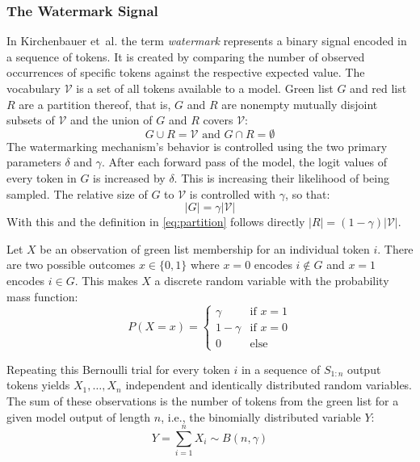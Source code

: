 	\subsubsection{The Watermark Signal}
	\label{sec:watermarkSignal}
    In Kirchenbauer et~al.\cite{kirchenbauer2023watermark} the term \emph{watermark} represents a binary signal encoded in a sequence of tokens. 
	It is created by comparing the number of observed occurrences of specific tokens against the respective expected value. 
	The vocabulary $\mathcal{V}$ is a set of all tokens available to a model. 
	Green list $G$ and red list $R$ are a partition thereof, that is, $G$ and $R$ are nonempty mutually disjoint subsets of $\mathcal{V}$ and the union of $G$ and $R$ covers $\mathcal{V}$:
	\begin{equation} \label{eq:partition}
		G \cup R = \mathcal{V} \text{ and } G \cap R = \emptyset
	\end{equation}
	The watermarking mechanism's behavior is controlled using the two primary parameters $\delta$ and $\gamma$.
	After each forward pass of the model, the logit values of every token in $G$ is increased by $\delta$.
	This is increasing their likelihood of being sampled.
	The relative size of $G$ to $\mathcal{V}$ is controlled with $\gamma$, so that:
	\begin{equation} 
		|G| = \gamma |\mathcal{V}|
	\end{equation}
	With this and the definition in \ref{eq:partition} follows directly $|R| = (1-\gamma) |\mathcal{V}|$.
	
	Let $X$ be an observation of green list membership for an individual token $i$. 
	There are two possible outcomes $x \in \{0,1\}$ where $x=0$ encodes $i \notin G$ and $x=1$ encodes $i \in G$.
	This makes $X$ a discrete random variable with the probability mass function:
	\begin{equation}
		P(X=x) = 
			\begin{cases}
					\gamma 		& \text{if $x = 1$} \\
					1 - \gamma 	& \text{if $x = 0$}  \\
					0 			& \text{else}
			\end{cases}
	\end{equation}

	Repeating this Bernoulli trial for every token $i$ in a sequence of $S_{1:n}$ output tokens yields $X_{1}, \dots, X_{n}$ independent and identically distributed random variables.
    The sum of these observations is the number of tokens from the green list for a given model output of length $n$, i.e., the binomially distributed variable $Y$:
	\begin{equation}
		Y = \sum_{i=1}^{n} X_i \sim B(n, \gamma)
	\end{equation}
 	
